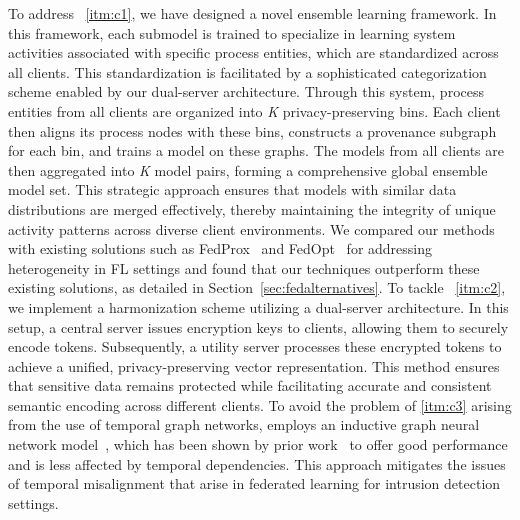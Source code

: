 
To address ~\ref{itm:c1}, we have designed a novel ensemble learning framework. In this framework, each submodel is trained to specialize in learning system activities associated with specific process entities, which are standardized across all clients. This standardization is facilitated by a sophisticated categorization scheme enabled by our dual-server architecture. Through this system, process entities from all clients are organized into \textit{K} privacy-preserving bins. Each client then aligns its process nodes with these bins, constructs a provenance subgraph for each bin, and trains a \gnnshort model on these graphs. The models from all clients are then aggregated into \textit{K} model pairs, forming a comprehensive global ensemble model set. This strategic approach ensures that models with similar data distributions are merged effectively, thereby maintaining the integrity of unique activity patterns across diverse client environments. We compared our methods with existing solutions such as FedProx~\cite{li2020federated} and FedOpt~\cite{asad2020fedopt} for addressing heterogeneity in FL settings and found that our techniques outperform these existing solutions, as detailed in Section~\ref{sec:fedalternatives}. To tackle ~\ref{itm:c2}, we implement a \wordvec harmonization scheme utilizing a dual-server architecture. In this setup, a central server issues encryption keys to clients, allowing them to securely encode \wordvec tokens. Subsequently, a utility server processes these encrypted tokens to achieve a unified, privacy-preserving vector representation. This method ensures that sensitive data remains protected while facilitating accurate and consistent semantic encoding across different clients. To avoid the problem of \ref{itm:c3} arising from the use of temporal graph networks, \Sys employs an inductive graph neural network model~\cite{hamilton2017inductive}, which has been shown by prior work~\cite{flash2024,shadewatcher,wang2022threatrace} to offer good performance and is less affected by temporal dependencies. This approach mitigates the issues of temporal misalignment that arise in federated learning for intrusion detection settings.

